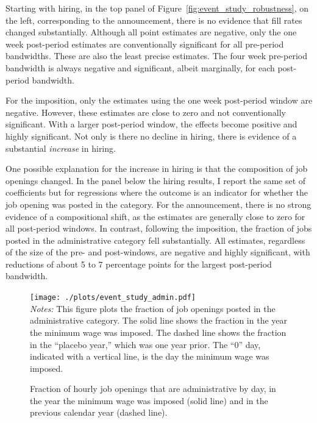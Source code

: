 Starting with hiring, in the top panel of Figure~\ref{fig:event_study_robustness}, on the left, corresponding to
the announcement, there is no evidence that fill rates changed substantially. 
Although all point estimates are negative, only the one week post-period estimates are conventionally significant for all pre-period bandwidths. 
These are also the least precise estimates. 
The four week pre-period bandwidth is always negative and significant, albeit marginally, for each post-period bandwidth.

For the imposition, only the estimates using the one week post-period window are negative. 
However, these estimates  are close to zero and not conventionally significant. 
With a larger post-period window, the effects become positive and highly significant. 
Not only is there no decline in hiring, there is evidence of a substantial \emph{increase} in hiring.

One possible explanation for the increase in hiring is that the composition of job openings changed. 
In the panel below the hiring results, I report the same set of coefficients but for regressions where the outcome is an indicator for whether the job opening was posted in the \admin{} category.
For the announcement, there is no strong evidence of a compositional shift, as the estimates are generally close to zero for all post-period windows.
In contrast, following the imposition, the fraction of jobs posted in the administrative category fell substantially.
All estimates, regardless of the size of the  pre- and post-windows, are negative and highly significant, with reductions of about 5 to 7 percentage points for the largest post-period bandwidth. 

\begin{figure}[h!]
  \caption{Fraction of hourly job openings that are administrative by day, in the year the minimum wage was imposed (solid line) and in the previous calendar year (dashed line).} \label{fig:admin_frac}
  \centering
\begin{minipage}{0.90\textwidth}
  \texttt{[image: ./plots/event\_study\_admin.pdf]}
{\footnotesize \\
  \emph{Notes:} This figure plots the fraction of job openings posted in the administrative category. 
The solid line shows the fraction in the year the minimum wage was imposed. 
The dashed line shows the fraction in the ``placebo year,'' which was one year prior.  
The ``0'' day, indicated with a vertical line, is the day the minimum wage was imposed. 
}
\end{minipage} 
\end{figure}


